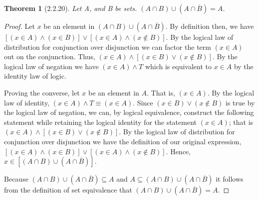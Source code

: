 \documentclass[a4paper, 12pt]{article}
\theoremstyle{plain}
\newtheorem*{theorem*}{Theorem}
\begin{document}
	
	\begin{theorem*}[2.2.20]
		Let A, and B be sets. $(A \cap B) \cup (A \cap \overline{B}) = A$.
	\end{theorem*}
	
	\begin{proof}
		Let $x$ be an element in $(A \cap B) \cup (A \cap \overline{B})$. By definition then, we have $[(x \in A) \land (x \in B)] \lor [(x \in A) \land (x \notin B)]$. By the logical law of distribution for conjunction over disjunction we can factor the term $(x \in A)$ out on the conjunction. Thus, $(x \in A) \land [(x \in B) \lor (x \notin B)]$. By the logical law of negation we have $(x \in A) \land T$ which is equivalent to $x \in A$ by the identity law of logic.
		
		Proving the converse, let $x$ be an element in $A$. That is, $(x \in A)$. By the logical law of identity, $(x \in A) \land T \equiv (x \in A)$. Since $(x \in B) \lor (x \notin B)$ is true by the logical law of negation, we can, by logical equivalence, construct the following statement while retaining the logical identity for the statement $(x \in A)$; that is $(x \in A) \land [(x \in B) \lor (x \notin B)]$. By the logical law of distribution for conjunction over disjunction we have the definition of our original expression, $[(x \in A) \land (x \in B)] \lor [(x \in A) \land (x \notin B)]$. Hence, $x \in [(A \cap B) \cup (A \cap \overline{B})]$.
		
		Because $(A \cap B) \cup (A \cap \overline{B}) \subseteq A$ and $A \subseteq  (A \cap B) \cup (A \cap \overline{B})$ it follows from the definition of set equivalence that $(A \cap B) \cup (A \cap \overline{B}) = A$.
	\end{proof}
\end{document}
